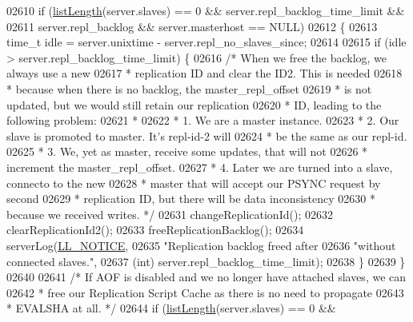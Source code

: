 \begin{DoxyCode}
{{{{{{{{{{{{{{{{{{{{{{{{{{{{{{{{{{{{{{{{{{{{{{{{{{{{{{{{{{{{{{{{{{{{{{{{{{{{{02610     \textcolor{keywordflow}{if} (\hyperlink{adlist_8h_afde0ab079f934670e82119b43120e94b}{listLength}(server.slaves) == 0 && server.repl\_backlog\_time\_limit &&
02611         server.repl\_backlog && server.masterhost == NULL)
02612     \{
02613         time\_t idle = server.unixtime - server.repl\_no\_slaves\_since;
02614 
02615         \textcolor{keywordflow}{if} (idle > server.repl\_backlog\_time\_limit) \{
02616             \textcolor{comment}{/* When we free the backlog, we always use a new}
02617 \textcolor{comment}{             * replication ID and clear the ID2. This is needed}
02618 \textcolor{comment}{             * because when there is no backlog, the master\_repl\_offset}
02619 \textcolor{comment}{             * is not updated, but we would still retain our replication}
02620 \textcolor{comment}{             * ID, leading to the following problem:}
02621 \textcolor{comment}{             *}
02622 \textcolor{comment}{             * 1. We are a master instance.}
02623 \textcolor{comment}{             * 2. Our slave is promoted to master. It's repl-id-2 will}
02624 \textcolor{comment}{             *    be the same as our repl-id.}
02625 \textcolor{comment}{             * 3. We, yet as master, receive some updates, that will not}
02626 \textcolor{comment}{             *    increment the master\_repl\_offset.}
02627 \textcolor{comment}{             * 4. Later we are turned into a slave, connecto to the new}
02628 \textcolor{comment}{             *    master that will accept our PSYNC request by second}
02629 \textcolor{comment}{             *    replication ID, but there will be data inconsistency}
02630 \textcolor{comment}{             *    because we received writes. */}
02631             changeReplicationId();
02632             clearReplicationId2();
02633             freeReplicationBacklog();
02634             serverLog(\hyperlink{server_8h_a8c54c191e436c7dd3012167212692401}{LL\_NOTICE},
02635                 \textcolor{stringliteral}{"Replication backlog freed after %
02636                 \textcolor{stringliteral}{"without connected slaves."},
02637                 (\textcolor{keywordtype}{int}) server.repl\_backlog\_time\_limit);
02638         \}
02639     \}
02640 
02641     \textcolor{comment}{/* If AOF is disabled and we no longer have attached slaves, we can}
02642 \textcolor{comment}{     * free our Replication Script Cache as there is no need to propagate}
02643 \textcolor{comment}{     * EVALSHA at all. */}
02644     \textcolor{keywordflow}{if} (\hyperlink{adlist_8h_afde0ab079f934670e82119b43120e94b}{listLength}(server.slaves) == 0 &&
}}}}}}}}}}}}}}}}}}}}}}}}}}}}}}}}}}}}}}}}}}}}}}}}}}}}}}}}}}}}}}}}}}}}}}}}}}}}}}
\end{DoxyCode}
